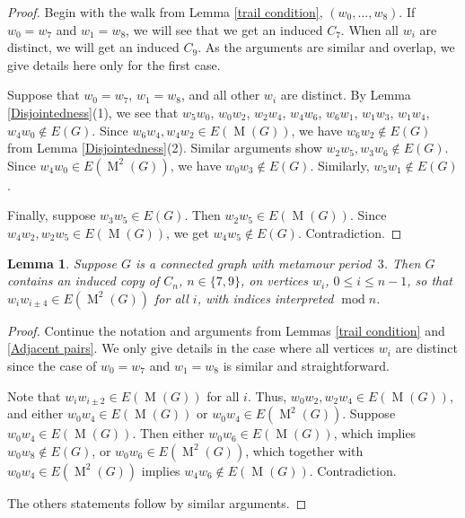 \documentclass[12pt]{amsart}
\newtheorem{lemma}[theorem]{Lemma}
\theoremstyle{definition}
\theoremstyle{remark}
\numberwithin{equation}{section}
\numberwithin{figure}{section}
\renewcommand{\mod}{\operatorname{mod}}
\newcommand{\M}{\operatorname{M}}
\begin{document}
\begin{proof}
    Begin with the walk from Lemma \ref{trail condition}, $(w_0,\ldots,w_8)$. If $w_0 = w_7$ and $w_1 = w_8$, we will see that we get an induced $C_7$. When all $w_i$ are distinct, we will get an induced $C_9$. As the arguments are similar and overlap, we give details here only for the first case. 
    
    Suppose that $w_0 = w_7$, $w_1 = w_8$, and all other $w_i$ are distinct.    
    By Lemma \ref{Disjointedness}(1), we see that $w_5w_0$,\! $w_0w_2$,\! $w_2w_4$,\! $w_4w_6$,\! $w_6w_1$,\! $w_1w_3$,\! $w_1w_4$,\! $w_4w_0 \notin E(G)$. Since $w_6w_4,w_4w_2 \in E(\M(G))$, we have $w_6w_2 \notin E(G)$ from Lemma \ref{Disjointedness}(2). Similar arguments show $w_2w_5, w_3w_6 \notin E(G)$. Since $w_4w_0 \in E(\M^2(G))$, we have $w_0w_3 \notin E(G)$. Similarly, $w_5w_1 \notin E(G)$.
    
    Finally, suppose $w_3w_5 \in E(G)$. Then $w_2w_5 \in E(\M(G))$. Since $w_4w_2,w_2w_5 \in E(\M(G))$, we get $w_4w_5 \notin E(G)$. Contradiction.
\end{proof}

\begin{lemma} \label{lem: c7 c9 with M2 condition}
    Suppose $G$ is a connected graph with  metamour period~$3$. 
    Then $G$ contains an induced copy of $C_n$, $n\in\{7,9\}$, on vertices $w_i$, $0\leq i \leq n-1$, so that $w_i w_{i\pm 4} \in E(\M^2(G))$ for all $i$, with indices interpreted $\mod n$.
\end{lemma}

\begin{proof}
    Continue the notation and arguments from Lemmas \ref{trail condition} and \ref{Adjacent pairs}.
    We only give details in the case where all vertices $w_i$ are distinct since the case of $w_0 = w_7$ and $w_1 = w_8$ is similar and straightforward.

    Note that $w_i w_{i\pm 2} \in E(\M(G))$ for all $i$. Thus, $w_0w_2,w_2w_4 \in E(\M(G))$, and either $w_0w_4 \in E(\M(G))$ or $w_0w_4 \in E(\M^2(G))$. Suppose $w_0w_4 \in E(\M(G))$. Then either $w_0w_6 \in E(\M(G))$, which implies $w_0w_8 \notin E(G)$, or $w_0w_6 \in E(\M^2(G))$, which together with $w_0w_4 \in E(\M^2(G))$ implies $w_4w_6 \notin E(\M(G))$. Contradiction.
    
    The others statements follow by similar arguments.
\end{proof}
\end{document}
